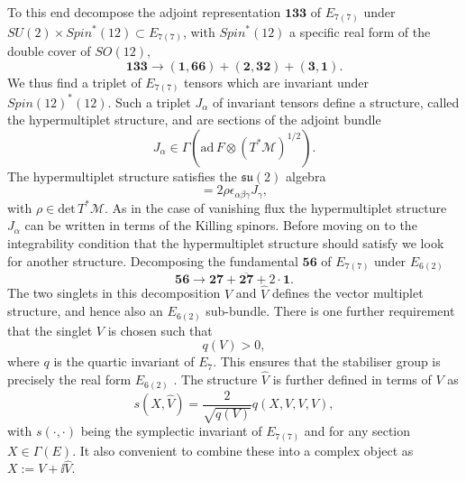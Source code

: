 To this end decompose the adjoint representation $\mathbf{133}$ of $E_{7(7)}$ under $SU(2)\times Spin^*(12)\subset E_{7(7)}$, with $Spin^*(12)$ a specific real form of the double cover of $SO(12)$,
\begin{equation}
    \mathbf{133}\to (\mathbf{1},\mathbf{66})+(\mathbf{2},\mathbf{32})+(\mathbf{3},\mathbf{1}).
\end{equation}
We thus find a triplet of $E_{7(7)}$ tensors which are invariant under $Spin(12)^*(12)$. Such a triplet $J_\alpha$ of invariant tensors define a structure, called the hypermultiplet structure, and are sections of the adjoint bundle 
\begin{equation}
    J_\alpha \in \Gamma(\text{ad}\, F\otimes \left(T^*\mathcal{M}\right)^{1/2}).
\end{equation}
The hypermultiplet structure satisfies the $\mathfrak{su}(2)$ algebra 
\begin{equation}
    [J_\alpha,J_\beta] =2\rho \epsilon_{\alpha\beta\gamma}J_\gamma,
\end{equation}
with $\rho\in\text{det}\,T^*\mathcal{M}$. As in the case of vanishing flux the hypermultiplet structure $J_\alpha$ can be written in terms of the Killing spinors. Before moving on to the integrability condition that the hypermultiplet structure should satisfy we look for another structure. Decomposing the fundamental $\mathbf{56}$ of $E_{7(7)}$ under $E_{6(2)}$
\begin{equation}
    \mathbf{56}\to\mathbf{27}+\overbar{\mathbf{27}}+2\cdot \mathbf{1}.
\end{equation}
The two singlets in this decomposition $V$ and $\hat{V}$ defines the vector multiplet structure, and hence also an $E_{6(2)}$ sub-bundle. There is one further requirement that the singlet $V$ is chosen such that 
\begin{equation}
    q(V)>0,
\end{equation}
where $q$ is the quartic invariant of $E_7$. This ensures that the stabiliser group is precisely the real form $E_{6(2)}$ \cite{Ferrara:1997uz}. The structure $\hat{V}$ is further defined in terms of $V$ as 
\begin{equation}
    s(X,\hat{V}) = \frac{2}{\sqrt{q(V)}}q(X,V,V,V),
\end{equation}
with $s(\cdot,\cdot)$ being the symplectic invariant of $E_{7(7)}$ and for any section $X\in\Gamma(E)$. It also convenient to combine these into a complex object as $X:= V+\ii\hat{V}$. 

